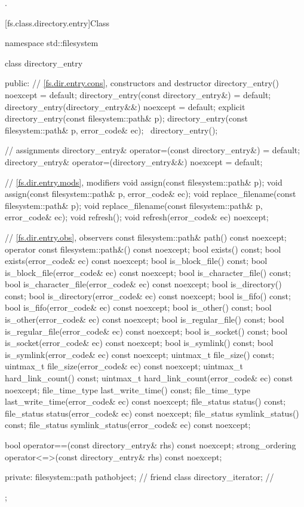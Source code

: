 \begin{itemdescr}
\pnum
\ensures
{}.
\end{itemdescr}

[fs.class.directory.entry]{Class }

%
\begin{codeblock}
namespace std::filesystem {
  class directory_entry {
  public:
    // \ref{fs.dir.entry.cons}, constructors and destructor
    directory_entry() noexcept = default;
    directory_entry(const directory_entry&) = default;
    directory_entry(directory_entry&&) noexcept = default;
    explicit directory_entry(const filesystem::path& p);
    directory_entry(const filesystem::path& p, error_code& ec);
    ~directory_entry();

    // assignments
    directory_entry& operator=(const directory_entry&) = default;
    directory_entry& operator=(directory_entry&&) noexcept = default;

    // \ref{fs.dir.entry.mods}, modifiers
    void assign(const filesystem::path& p);
    void assign(const filesystem::path& p, error_code& ec);
    void replace_filename(const filesystem::path& p);
    void replace_filename(const filesystem::path& p, error_code& ec);
    void refresh();
    void refresh(error_code& ec) noexcept;

    // \ref{fs.dir.entry.obs}, observers
    const filesystem::path& path() const noexcept;
    operator const filesystem::path&() const noexcept;
    bool exists() const;
    bool exists(error_code& ec) const noexcept;
    bool is_block_file() const;
    bool is_block_file(error_code& ec) const noexcept;
    bool is_character_file() const;
    bool is_character_file(error_code& ec) const noexcept;
    bool is_directory() const;
    bool is_directory(error_code& ec) const noexcept;
    bool is_fifo() const;
    bool is_fifo(error_code& ec) const noexcept;
    bool is_other() const;
    bool is_other(error_code& ec) const noexcept;
    bool is_regular_file() const;
    bool is_regular_file(error_code& ec) const noexcept;
    bool is_socket() const;
    bool is_socket(error_code& ec) const noexcept;
    bool is_symlink() const;
    bool is_symlink(error_code& ec) const noexcept;
    uintmax_t file_size() const;
    uintmax_t file_size(error_code& ec) const noexcept;
    uintmax_t hard_link_count() const;
    uintmax_t hard_link_count(error_code& ec) const noexcept;
    file_time_type last_write_time() const;
    file_time_type last_write_time(error_code& ec) const noexcept;
    file_status status() const;
    file_status status(error_code& ec) const noexcept;
    file_status symlink_status() const;
    file_status symlink_status(error_code& ec) const noexcept;

    bool operator==(const directory_entry& rhs) const noexcept;
    strong_ordering operator<=>(const directory_entry& rhs) const noexcept;

  private:
    filesystem::path pathobject;        // \expos
    friend class directory_iterator;    // \expos
  };
}
\end{codeblock}
